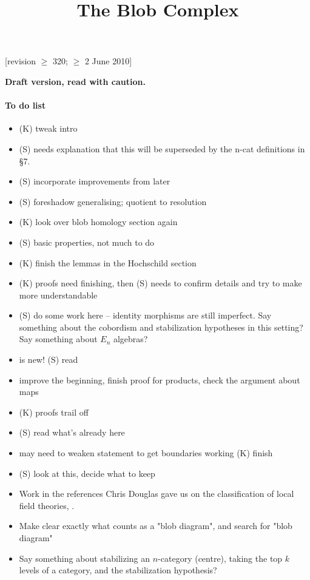 \documentclass[11pt,leqno]{article}
\title{The Blob Complex}
\begin{document}
\makeatletter
{}
\gdef\theequation{\thesection.\arabic{equation}}
\makeatother

\maketitle

[revision $\ge$ 320;  $\ge$ 2 June 2010]

\textbf{Draft version, read with caution.}


\paragraph{To do list}
\begin{itemize}
\item[1] (K) tweak intro
\item[2] (S) needs explanation that this will be superseded by the n-cat
definitions in \S 7.
\item[2] (S) incorporate improvements from later
\item[2.3] (S) foreshadow generalising; quotient to resolution
\item[3] (K) look over blob homology section again
\item[4] (S) basic properties, not much to do
\item[5] (K) finish the lemmas in the Hochschild section
\item[6] (K) proofs need finishing, then (S) needs to confirm details and try
to make more understandable
\item[7] (S) do some work here -- identity morphisms are still imperfect. Say something about the cobordism and stabilization hypotheses \cite{MR1355899} in this setting? Say something about $E_n$ algebras?
\item[7.6] is new! (S) read
\item[8] improve the beginning, finish proof for products,
check the argument about maps
\item[9] (K) proofs trail off
\item[10] (S) read what's already here
\item[A] may need to weaken statement to get boundaries working (K) finish
\item[B] (S) look at this, decide what to keep

\item Work in the references Chris Douglas gave us on the classification of local field theories, \cite{BDH-seminar,DSP-seminar,schommer-pries-thesis,0905.0465}.
\item Make clear exactly what counts as a "blob diagram", and search for
"blob diagram"

\item Say something about stabilizing an $n$-category (centre), taking the top $k$ levels of a category, and the stabilization hypothesis?
\end{itemize}
\end{document}
